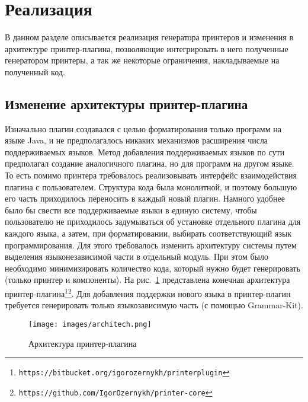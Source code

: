 \section{Реализация}
\label{sec:impl}
\lstset{basicstyle=\normalsize\ttfamily, columns=fullflexible}
В данном разделе описывается реализация генератора принтеров и изменения в архитектуре принтер-плагина, позволяющие интегрировать в него полученные генератором принтеры, а так же некоторые ограничения, накладываемые на полученный код.

\subsection{Изменение архитектуры принтер-плагина}
Изначально плагин создавался с целью форматирования только программ на языке Java, и не предполагалось никаких механизмов расширения числа поддерживаемых языков.
Метод добавления поддерживаемых языков \cite{paper:while} по сути предполагал создание аналогичного плагина, но для программ на другом языке.
То есть помимо принтера требовалось реализовывать интерфейс взаимодействия плагина с пользователем.
Структура кода была монолитной, и поэтому большую его часть приходилось переносить в каждый новый плагин.
Намного удобнее было бы свести все поддерживаемые языки в единую систему, чтобы пользователю не приходилось задумываться об установке отдельного плагина для каждого языка, а затем, при форматировании, выбирать соответствующий язык программирования.
Для этого требовалось изменить архитектуру системы путем выделения языконезависимой части в отдельный модуль.
При этом было необходимо минимизировать количество кода, который нужно будет генерировать (только принтер и компоненты).
На рис.~\ref{impl:architechture} представлена конечная архитектура принтер-плагина\footnote{\texttt{https://bitbucket.org/igorozernykh/printerplugin}}\footnote{\texttt{https://github.com/IgorOzernykh/printer-core}}.
Для добавления поддержки нового языка в принтер-плагин требуется генерировать только языкозависимую часть (с помощью Grammar-Kit).
\begin{figure}[h]
    \centering
    \texttt{[image: images/architech.png]}
    \caption{Архитектура принтер-плагина}
    \label{impl:architechture}
\end{figure}

